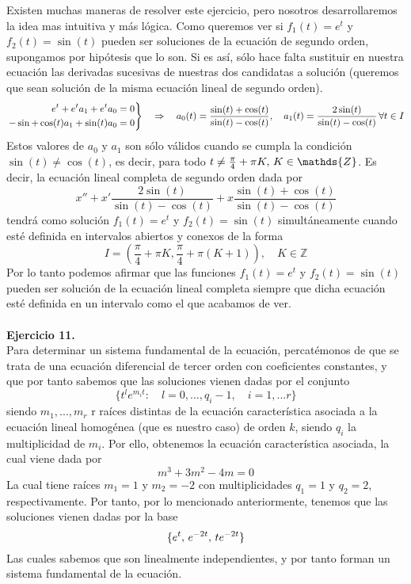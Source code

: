 \documentclass[fleqn]{article}
\def\Z{\mathds{Z}}
\begin{document}
    Existen muchas maneras de resolver este ejercicio, pero nosotros desarrollaremos la idea mas intuitiva y más lógica. Como queremos ver si $f_1(t) = e^t$ y $f_2(t)=\sin (t)$
    pueden ser soluciones de la ecuación de segundo orden, supongamos por hipótesis que lo son. Si es así, sólo hace falta sustituir en nuestra ecuación 
    las derivadas sucesivas de nuestras dos candidatas a solución (queremos que sean solución de la misma ecuación lineal de segundo orden).
    \begin{equation*}
        \left.
        \begin{aligned}
            e^t + e^ta_1 + e^t a_0 = 0 \\
            -\sin + \cos(t)a_1 + \sin(t)a_0=0
        \end{aligned}
        \right\} \quad \Rightarrow \quad a_0(t)=\frac{\sin(t) + \cos(t)}{\sin(t) - \cos(t)}, \quad a_1(t)=\frac{2\sin(t)}{\sin(t) - \cos(t)} \thinspace \forall t \in I
    \end{equation*}
    Estos valores de $a_0$ y $a_1$ son sólo válidos cuando se cumpla la condición $\sin(t) \neq \cos(t)$, es decir, para todo $t \neq \frac{\pi}{4} + \pi K, \thinspace K \in \Z$.
    Es decir, la ecuación lineal completa de segundo orden dada por 
    $$x'' + x'\frac{2\sin(t)}{\sin(t) - \cos(t)} + x\frac{\sin(t) + \cos(t)}{\sin(t) - \cos(t)}$$
    tendrá como solución $f_1(t) = e^t$ y $f_2(t)=\sin (t)$ simultáneamente cuando esté definida en intervalos abiertos y conexos de la forma 
    $$I = \left(\frac{\pi}{4} + \pi K, \frac{\pi}{4} + \pi (K+1)\right), \quad K \in \Z$$
    Por lo tanto podemos afirmar que las funciones $f_1(t) = e^t$ y $f_2(t)=\sin (t)$ pueden ser solución de la ecuación lineal completa siempre que dicha ecuación
    esté definida en un intervalo como el que acabamos de ver.\\ \\

    \textbf{Ejercicio 11.} \\

    Para determinar un sistema fundamental de la ecuación, percatémonos de que se trata de una ecuación diferencial de tercer orden con coeficientes constantes,
    y que por tanto sabemos que las soluciones vienen dadas por el conjunto
    $$\{t^le^{m_it}: \quad l=0,...,q_i-1, \quad i=1,...r\}$$
    siendo $m_1,...,m_r$ r raíces distintas de la ecuación característica asociada a la ecuación lineal homogénea (que es nuestro caso) de orden $k$, siendo 
    $q_i$ la multiplicidad de $m_i$. Por ello, obtenemos la ecuación característica asociada, la cual viene dada por 
    $$m^3 + 3m^2 -4m = 0$$
    La cual tiene raíces $m_1 = 1$ y $m_2 = -2$ con multiplicidades $q_1 = 1$ y $q_2 = 2$, respectivamente. Por tanto, por lo mencionado anteriormente, tenemos
    que las soluciones vienen dadas por la base 
    $$\{e^t, \thinspace e^{-2t}, \thinspace te^{-2t}\}$$
    Las cuales sabemos que son linealmente independientes, y por tanto forman un sistema fundamental de la ecuación.
\end{document}
